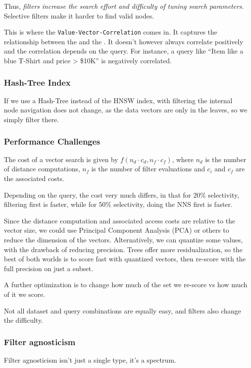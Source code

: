 Thus, \textit{filters increase the search effort and difficulty of tuning search parameters}.
Selective filters make it harder to find valid nodes.

This is where the \texttt{Value-Vector-Correlation} comes in. It captures the relationship between the 
and the .
It doesn't however always correlate positively and the correlation depends on the query.
For instance, a query like ``Item like a blue T-Shirt and price > \$10K'' is negatively correlated.


\subsubsection{Hash-Tree Index}
If we use a Hash-Tree instead of the HNSW index, with filtering the internal node navigation does not change, as the data vectors are only in the leaves,
so we simply filter there.


\subsubsection{Performance Challenges}
The cost of a vector search is given by $f(n_d \cdot c_d, n_f \cdot c_f)$, where $n_d$ is the number of distance computations, $n_f$ is the number of filter evaluations
and $c_i$ and $c_f$ are the associated costs.

Depending on the query, the cost very much differs, in that for 20\% selectivity, filtering first is faster, while for 50\% selectivity, doing the NNS first is faster.

Since the distance computation and associated access costs are relative to the vector size,
we could use Principal Component Analysis (PCA) or others to reduce the dimension of the vectors.
Alternatively, we can quantize some values, with the drawback of reducing precision.
Trees offer more residualization, so the best of both worlds is to score fast with quantized vectors, then re-score with the full precision on just a subset.

A further optimization is to change how much of the set we re-score vs how much of it we score.

Not all dataset and query combinations are equally easy, and filters also change the difficulty.


\subsubsection{Filter agnosticism}
Filter agnosticism isn't just a single type, it's a spectrum.

